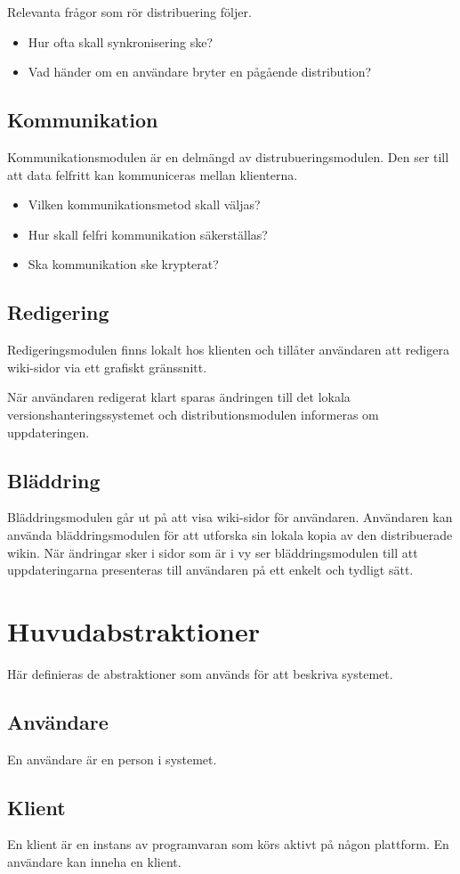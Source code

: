 Relevanta frågor som rör distribuering följer.
\begin{itemize}
\item Hur ofta skall synkronisering ske?
\item Vad händer om en användare bryter en pågående distribution?
\end{itemize}
\subsection{Kommunikation}
Kommunikationsmodulen är en delmängd av distrubueringsmodulen. Den ser till att data felfritt kan kommuniceras mellan klienterna.

\begin{itemize}
\item Vilken kommunikationsmetod skall väljas?
\item Hur skall felfri kommunikation säkerställas?
\item Ska kommunikation ske krypterat?
\end{itemize}
\subsection{Redigering}
Redigeringsmodulen finns lokalt hos klienten och tillåter användaren att redigera wiki-sidor via ett grafiskt gränssnitt.

När användaren redigerat klart sparas ändringen till det lokala versionshanteringssystemet och distributionsmodulen informeras om uppdateringen.
\subsection{Bläddring}
Bläddringsmodulen går ut på att visa wiki-sidor för användaren. Användaren kan använda bläddringsmodulen för att utforska sin lokala kopia av den distribuerade wikin. När ändringar sker i sidor som är i vy ser bläddringsmodulen till att uppdateringarna presenteras till användaren på ett enkelt och tydligt sätt.
\section{Huvudabstraktioner}
Här definieras de abstraktioner som används för att beskriva systemet.
\subsection*{Användare}
En användare är en person i systemet. 
\subsection*{Klient}
En klient är en instans av programvaran som körs aktivt på någon plattform. En användare kan inneha en klient.

